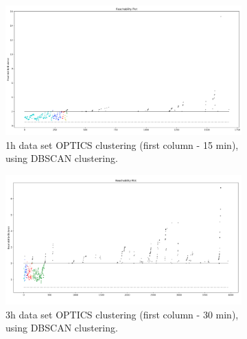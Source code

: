 \begin{figure}[H]
  \centering
  \begin{subfigure}{.475\textwidth}
    \centering
    \includegraphics[width=1\textwidth]{./images/clusteringResults/1h-1-reachabilityPlot.png}
  \caption{1h data set OPTICS clustering (first column - 15 min), using DBSCAN clustering.}
  \end{subfigure}%
  \begin{subfigure}{.475\textwidth}
    \centering
    \includegraphics[width=1\textwidth]{./images/clusteringResults/3h-1-reachabilityPlot.png}
    \caption{3h data set OPTICS clustering (first column - 30 min), using DBSCAN clustering.}
  \end{subfigure}
  \caption{}
  \label{figure:OPTICSResultsReachabilityPlot}
  \end{figure}












